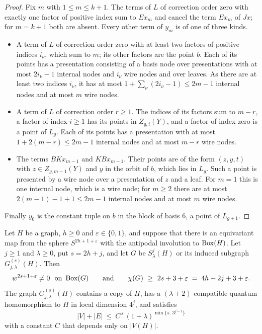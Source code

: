 \begin{proof}
Fix $m$ with $1\le m\le k+1$. The terms of $L$ of correction order zero with exactly one factor of positive index sum to $Ex_m$ and cancel the term $Ex_m$ of $Jx$; for $m=k+1$ both are absent. Every other term of $y_m$ is of one of three kinds.
\begin{itemize}
\item A term of $L$ of correction order zero with at least two factors of positive indices $i_\nu$, which sum to $m$; its other factors are the point $b$. Each of its points has a presentation consisting of a basis node over presentations with at most $2i_\nu-1$ internal nodes and $i_\nu$ wire nodes and over leaves. As there are at least two indices $i_\nu$, it has at most $1+\sum_\nu(2i_\nu-1)\le2m-1$ internal nodes and at most $m$ wire nodes.
\item A term of $L$ of correction order $r\ge1$. The indices of its factors sum to $m-r$, a factor of index $i\ge1$ has its points in $Z_{g,i}(Y)$, and a factor of index zero is a point of $L_g$. Each of its points has a presentation with at most $1+2(m-r)\le2m-1$ internal nodes and at most $m-r$ wire nodes.
\item The terms $BKx_{m-1}$ and $KBx_{m-1}$. Their points are of the form $(z,y,t)$ with $z\in Z_{g,m-1}(Y)$ and $y$ in the orbit of $b$, which lies in $L_g$. Such a point is presented by a wire node over a presentation of $z$ and a leaf. For $m=1$ this is one internal node, which is a wire node; for $m\ge2$ there are at most $2(m-1)-1+1\le2m-1$ internal nodes and at most $m$ wire nodes.
\end{itemize}
Finally $y_0$ is the constant tuple on $b$ in the block of basis $6$, a point of $L_{g+1}$.
\end{proof}

\begin{theorem}\label{thm:spheres}
Let $H$ be a graph, $h\ge0$ and $\varepsilon\in\{0,1\}$, and suppose that there is an equivariant map from the sphere $S^{2h+1+\varepsilon}$ with the antipodal involution to $\operatorname{Box}(H)$. Let $j\ge1$ and $\lambda\ge0$, put $s=2h+j$, and let $G$ be $S^j_\lambda(H)$ or its induced subgraph $G^{(s)}_{j,\lambda}(H)$. Then
\[
 w^{2s+1+\varepsilon}\ne0\ \text{ on }\B(G)\qquad\text{and}\qquad\chi(G)\ \ge\ 2s+3+\varepsilon\;=\;4h+2j+3+\varepsilon .
\]
The graph $G^{(s)}_{j,\lambda}(H)$ contains a copy of $H$, has a $(\lambda+2)$-compatible quantum homomorphism to $H$ in local dimension $4^j$, and satisfies
\[
 |V|+|E|\ \le\ C^{\,s}\,(1+\lambda)^{\min\{s,\,3^{j-1}\}}
\]
with a constant $C$ that depends only on $|V(H)|$.
\end{theorem}

